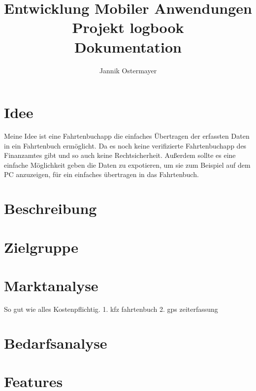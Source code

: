 \documentclass{article}
\title{Entwicklung Mobiler Anwendungen \\Projekt logbook \\ Dokumentation}
\author{Jannik Ostermayer}
\begin{document}
\begin{titlepage}
    \clearpage
    \maketitle          %
    \thispagestyle{empty}
\end{titlepage}

\tableofcontents    %
\pagebreak          %

\section{Idee}
Meine Idee ist eine Fahrtenbuchapp die einfaches Übertragen der erfassten Daten in ein Fahrtenbuch ermöglicht.
Da es noch keine verifizierte Fahrtenbuchapp des Finanzamtes gibt und so auch keine Rechtsicherheit.
Außerdem sollte es eine einfache Möglichkeit geben die Daten zu expotieren, um sie zum Beispiel auf dem
PC anzuzeigen, für ein einfaches übertragen in das Fahrtenbuch.

\section{Beschreibung}

\section{Zielgruppe}

\section{Marktanalyse}
So gut wie alles Kostenpflichtig.
1. kfz fahrtenbuch
2. gps zeiterfassung

\section{Bedarfsanalyse}

\section{Features}
\end{document}
